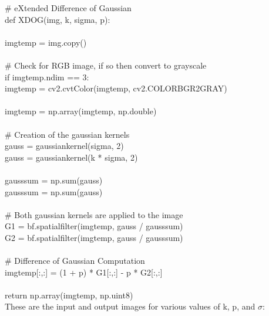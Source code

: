 \documentclass{article}
\begin{document}
	\noindent \# eXtended Difference of Gaussian\\
	\noindent def XDOG(img, k, sigma, p):\\
	\\
	\indent img\textunderscore temp = img.copy()\\
	\\
	\indent \#    Check for RGB image, if so then convert to grayscale\\
	\indent if img\textunderscore temp.ndim == 3:\\
	\indent \indent img\textunderscore temp = cv2.cvtColor(img\textunderscore temp, cv2.COLOR\textunderscore BGR2GRAY)\\
	\\
	\indent img\textunderscore temp = np.array(img\textunderscore temp, np.double)\\
	\\
	\indent \#    Creation of the gaussian kernels\\
	\indent gauss = gaussian\textunderscore kernel(sigma, 2)\\		\indent gauss = gaussian\textunderscore kernel(k * sigma, 2)\\
	\\
	\indent gauss\textunderscore sum = np.sum(gauss)\\
	\indent gauss\textunderscore sum = np.sum(gauss)\\
	\\
	\indent \#    Both gaussian kernels are applied to the image\\
	\indent G1 = bf.spatial\textunderscore filter(img\textunderscore temp, \indent gauss / gauss\textunderscore sum)\\
	\indent G2 = bf.spatial\textunderscore filter(img\textunderscore temp, \indent gauss / gauss\textunderscore sum)\\
	\\
	\indent \#    Difference of Gaussian Computation\\
	\indent img\textunderscore temp[:,:] = (1 + p) * G1[:,:] - p * G2[:,:]\\
	\\
	\indent return np.array(img\textunderscore temp, np.uint8)\\
		
	These are the input and output images for various values of k, p, and $\sigma$:\\
\end{document}
